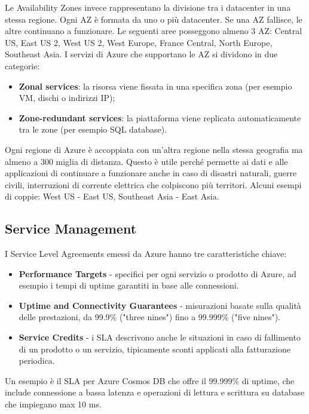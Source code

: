 Le Availability Zones invece rappresentano la divisione tra i datacenter in una stessa regione. Ogni AZ è formata da uno o più datacenter. Se una AZ fallisce, le altre continuano a funzionare. Le seguenti aree posseggono almeno 3 AZ: Central US, East US 2, West US 2, West Europe, France Central, North Europe, Southeast Asia.
I servizi di Azure che supportano le AZ si dividono in due categorie:
\begin{itemize}
    \item \textbf{Zonal services}: la risorsa viene fissata in una specifica zona (per esempio VM, dischi o indirizzi IP);
    \item \textbf{Zone-redundant services}: la piattaforma viene replicata automaticamente tra le zone (per esempio SQL database).
\end{itemize}
Ogni regione di Azure è accoppiata con un'altra regione nella stessa geografia ma almeno a 300 miglia di distanza. Questo è utile perché permette ai dati e alle applicazioni di continuare a funzionare anche in caso di disastri naturali, guerre civili, interruzioni di corrente elettrica che colpiscono più territori. Alcuni esempi di coppie: West US - East US, Southeast Asia - East Asia.

\subsection{Service Management}

I Service Level Agreements emessi da Azure hanno tre caratteristiche chiave:
\begin{itemize}
    \item \textbf{Performance Targets} - specifici per ogni servizio o prodotto di Azure, ad esempio i tempi di uptime garantiti in base alle connessioni.
    \item \textbf{Uptime and Connectivity Guarantees} - misurazioni basate sulla qualità delle prestazioni, da 99.9\% ("three nines") fino a 99.999\% ("five nines").
    \item \textbf{Service Credits} - i SLA descrivono anche le situazioni in caso di fallimento di un prodotto o un servizio, tipicamente sconti applicati alla fatturazione periodica.
\end{itemize}
Un esempio è il SLA per Azure Cosmos DB che offre il 99.999\% di uptime, che include connessione a bassa latenza e operazioni di lettura e scrittura su database che impiegano max 10 ms.
